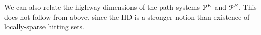 
We can also relate the highway dimensions of the path systems $\mathcal{P}^E$ and $\mathcal{P}^B$. This does not follow from above, since the HD is a stronger notion than existence of locally-sparse hitting sets.
%
